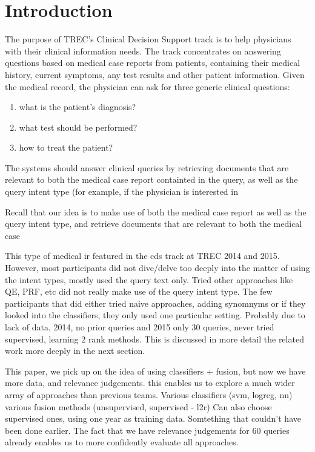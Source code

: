 \chapter{Introduction}
\cite{bringhurst1996ets}

The purpose of TREC's Clinical Decision Support track is to help physicians with their clinical information needs. The track concentrates
on answering questions based on medical case reports from patients, containing their medical history, current symptoms, any test results and other
patient information.
Given the medical record, the physician can ask for three generic clinical questions: 
\begin{enumerate}[label=\arabic*)]
 \item what is the patient's diagnosis?
 \item what test should be performed?
 \item how to treat the patient?
\end{enumerate}

The systems should answer clinical queries by retrieving documents that are relevant to both the medical case report
containted in the query, as well as the query intent type (for example, if the physician is interested in 

Recall that our idea is to make use of both the medical case report as well as the query intent type, and retrieve documents
that are relevant to both the medical case 

This type of medical ir featured in the cds track at TREC 2014 and 2015.
However, most participants did not dive/delve too deeply into the matter of using the intent types, mostly used the query text only.
Tried other approaches like QE, PRF, etc did not really make use of
the query intent type.
The few participants that did either tried naive approaches, adding synomnyms or if they looked into the classifiers, they only used one particular setting.
Probably due to lack of data, 2014, no prior queries and 2015 only 30 queries, never tried supervised, learning 2 rank methods.
This is discussed in more detail the related work more deeply in the next section.

This paper, we pick up on the idea of using classifiers + fusion, but now we have more data, and relevance judgements. 
this enables us to explore a much wider array of approaches than previous teams.
Various classifiers (svm, logreg, nn)
various fusion methods (unsupervised, supervised - l2r)
Can also choose supervised ones, using one year as training data. Somtething that couldn't have been done earlier.
The fact that we have relevance judgements for 60 queries already enables us to more confidently evaluate all approaches.

